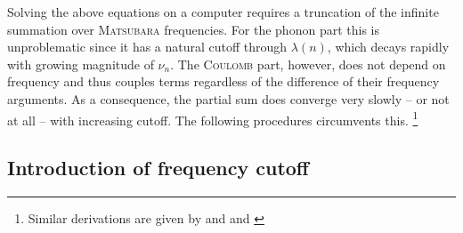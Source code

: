 Solving the above equations on a computer requires a truncation of the infinite
summation over \textsc{Matsubara} frequencies. For the phonon part this is
unproblematic since it has a natural cutoff through $\lambda(n)$, which decays
rapidly with growing magnitude of $\nu_n$. The \textsc{Coulomb} part, however,
does not depend on frequency and thus couples terms regardless of the difference
of their frequency arguments. As a consequence, the partial sum does converge
very slowly -- or not at all -- with increasing cutoff. The following procedures
circumvents this.%
%
\footnote{Similar derivations are given by 
\cite[185-188]{Schrieffer83} and  and 
\cite[Section~9]{AllenMitrovic82}}

\subsection{Introduction of frequency cutoff}
\label{introduction of frequency cutoff}

